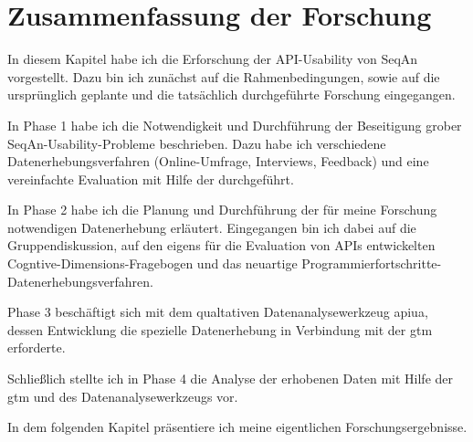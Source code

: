 \section{Zusammenfassung der Forschung}

In diesem Kapitel habe ich die Erforschung der API-Usability von SeqAn vorgestellt. Dazu bin ich zunächst auf die Rahmenbedingungen, sowie auf die ursprünglich geplante und die tatsächlich durchgeführte Forschung eingegangen.

In Phase 1 habe ich die Notwendigkeit und Durchführung der Beseitigung grober SeqAn-Usability-Probleme beschrieben. Dazu habe ich verschiedene Datenerhebungsverfahren (Online-Umfrage, Interviews, Feedback) und eine vereinfachte Evaluation mit Hilfe der  durchgeführt.

In Phase 2 habe ich die Planung und Durchführung der für meine Forschung notwendigen Datenerhebung erläutert. Eingegangen bin ich dabei auf die Gruppendiskussion, auf den eigens für die Evaluation von APIs entwickelten Cogntive-Dimensions-Fragebogen und das neuartige Programmierfortschritte-Datenerhebungsverfahren.

Phase 3 beschäftigt sich mit dem qualtativen Datenanalysewerkzeug \gls{apiua}, dessen Entwicklung die spezielle Datenerhebung in Verbindung mit der \gls{gtm} erforderte.

Schließlich stellte ich in Phase 4 die Analyse der erhobenen Daten mit Hilfe der \gls{gtm} und des Datenanalysewerkzeugs vor.

\bigskip

In dem folgenden Kapitel präsentiere ich meine eigentlichen Forschungsergebnisse.

\cleardoublepage